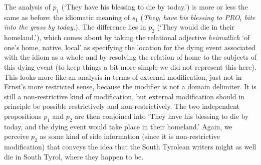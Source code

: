 \documentclass[output=paper]{langsci/langscibook}
\begin{document}



\noindent The analysis of $p_{1}$ (`They have his blessing to die by today.') is more or less the same as before: the idiomatic meaning of $s_{1}$ (\textit{They$_{i}$ have his blessing to PRO$_i$ bite into the grass by today.}). The difference lies in $p_{2}$ (`They would die in their homeland.'), which comes about by taking the relational adjective \textit{heimatlich} `of one's home, native, local' as specifying the location for the dying event associated with the idiom as a whole and by resolving the relation of home to the subjects of this dying event (to keep things a bit more simple we did not represent this here). This looks more like an analysis in terms of external modification, just not in Ernst's more restricted sense, because the modifier is not a domain delimiter. It is still a non-restrictive kind of modification, but external modification should in principle be possible restrictively and non-restrictively. The two independent propositions $p_{1}$ and $p_{2}$ are then conjoined into `They have his blessing to die by today, and the dying event would take place in their homeland.' Again, we perceive $p_{2}$ as some kind of side information (since it is non-restrictive modification) that conveys the idea that the South Tyrolean writers might as well die in South Tyrol, where they happen to be.
\end{document}
